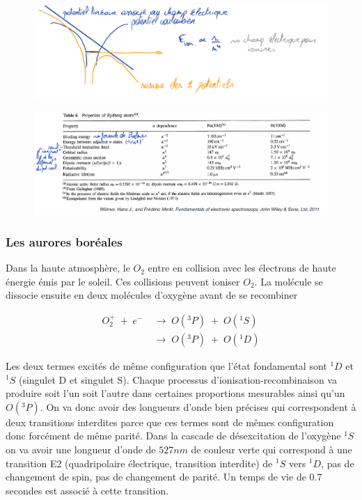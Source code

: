 \begin{figure}[tph]
    \centering
    \includegraphics[width=\textwidth]{Images2/DessinStark.PNG}
\end{figure}
\begin{figure}[tph]
    \centering
    \includegraphics[width=\textwidth]{Images2/TableauStark.PNG}
\end{figure}



    \subsubsection{Les aurores boréales}




Dans la haute atmosphère, le $O_2$ entre en collision avec les électrons de haute énergie émis par le soleil. Ces collisions peuvent ioniser $O_2$. La molécule se dissocie ensuite en deux molécules d'oxygène avant de se recombiner

\begin{align*}
    O_2^+ \; + \; e^- \; &\longrightarrow \;O(^3P)\; +\; O(^1S)  \\
    &\longrightarrow\; O(^3P)\; +\; O(^1D)
\end{align*}

Les deux termes excités de même configuration que l'état fondamental sont $^1D$ et $^1S$ (singulet D et singulet S). Chaque processus d'ionisation-recombinaison va produire soit l'un soit l'autre dans certaines proportions mesurables ainsi qu'un $O(^3P)$. On va donc avoir des longueurs d'onde bien précises qui correspondent à deux transitions interdites parce que ces termes sont de mêmes configuration donc forcément de même parité. Dans la cascade de désexcitation de l'oxygène $^1S$ on va avoir une longueur d'onde de $527nm$ de couleur verte qui correspond à une transition E2 (quadripolaire électrique, transition interdite) de  $^1S$ vers $^1D$, pas de changement de spin, pas de changement de parité. Un temps de vie de 0.7 secondes est associé à cette transition.\\

